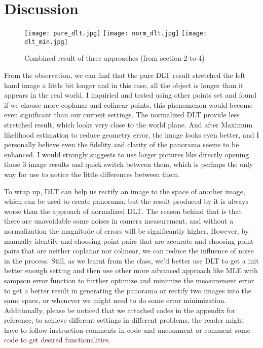 \documentclass[conference]{IEEEtran}
\begin{document}
\section{Discussion}
\begin{figure}[!htbp]
\begin{center}
\texttt{[image: pure\_dlt.jpg]} 
\texttt{[image: norm\_dlt.jpg]}
\texttt{[image: dlt\_min.jpg]} 
\end{center}	   
\caption{Combined result of three approaches (from section 2 to 4)}\label{pure_dlt}
\end{figure}
From the observation, we can find that the pure DLT result stretched the left hand image a little bit
longer and in this case, all the object is longer than it appears in the real world. I inquiried and tested using other points set and found if we choose more coplanar and colinear points, this phenomenon would become even significant than our current settings. The
normalized DLT provide less stretched result, which looks very close to the world plane. And
after Maximum likelihood estimation to reduce geometry error, the image looks even better, and I personally believe even the fidelity and clarity of the panorama seems to be enhanced. I would strongly suggests to use larger pictures like directly opening those 3 image results and quick switch between them, which is perhaps the only way for use to notice the little differences between them.

To wrap up, DLT can help us rectify an image to the space of another image, which can be used to create panorama, but the result produced by it is always worse than the approach of normalized DLT. The reason behind that is that there are unavoidable some noises in camera measurement, and without a normalization the magnitude of errors will be significantly higher. However, by manually identify and choosing point pairs that are accurate and choosing point pairs that are neither coplanar nor colinear, we can reduce the influence of noise in the process. Still, as we learnt from the class, we'd better use DLT to get a init better enough setting and then use other more advanced approach like MLE with sampson error function to further optimize and minimize the measurement error to get a better result in generating the panorama or rectify two images into the same space, or whenever we might need to do some error minimization. Additionally, please be noticed that we attached codes in the appendix for reference, to achieve different settings in different problems, the reader might have to follow instruction comments in code and uncomment or comment some code to get desired functionalities.
\newpage
\appendix
\end{document}
